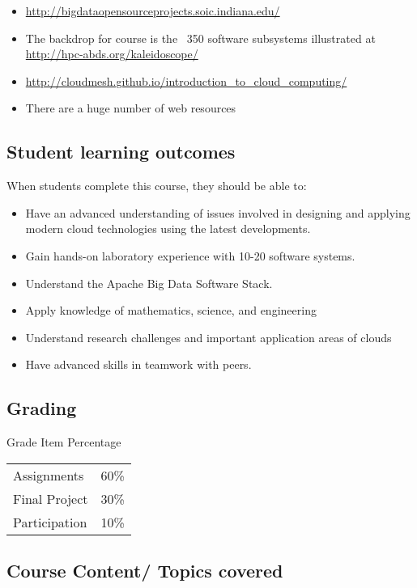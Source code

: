 \begin{itemize}
\item	\url{http://bigdataopensourceprojects.soic.indiana.edu/}
\item	The backdrop for course is the ~350 software subsystems illustrated at \url{http://hpc-abds.org/kaleidoscope/}
\item	\url{http://cloudmesh.github.io/introduction_to_cloud_computing/}
\item	There are a huge number of web resources
\end{itemize}

\subsection{Student learning outcomes}

When students complete this course, they should be able to:

\begin{itemize}
\item	Have an advanced understanding of issues involved in designing and applying modern cloud technologies using the latest developments.
\item	Gain hands-on laboratory experience with 10-20 software systems.
\item	Understand the Apache Big Data Software Stack.
\item	Apply knowledge of mathematics, science, and engineering
\item	Understand research challenges and important application areas of clouds
\item	Have advanced skills in teamwork with peers.
\end{itemize}

\subsection{Grading}

Grade Item	Percentage
\begin{tabular}{lr}
Assignments	  & 60\% \\
Final Project	& 30\% \\
Participation	& 10\% \\
\end{tabular}

\subsection{Course Content/ Topics covered} 


